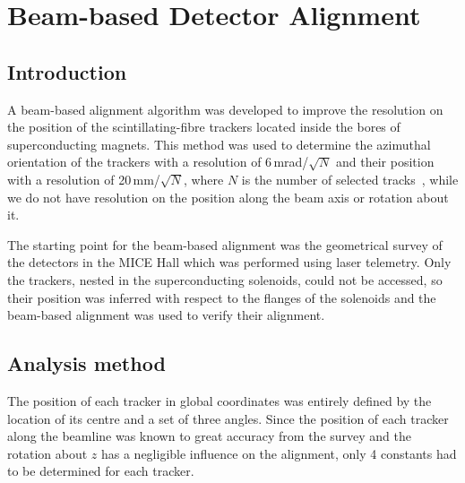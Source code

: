 \graphicspath{{09-Detector-alignment/Figures/}}

\section{Beam-based Detector Alignment}
\label{Sect:DA}

\subsection{Introduction}
\label{SubSect:DA_Intro}

A beam-based alignment algorithm was developed to improve the resolution on the position of the scintillating-fibre trackers located inside the bores of superconducting magnets. This method was used to determine the azimuthal orientation of the trackers with a resolution of 6\,mrad/$\sqrt{N}$ and their position with a resolution of 20\,mm/$\sqrt{N}$, where $N$ is the number of selected tracks~\cite{2018arXiv1805.06623T}, while we do not have resolution on the position along the beam axis or rotation about it.


The starting point for the beam-based alignment was the geometrical survey of the detectors in the MICE Hall which was performed using laser telemetry.
Only the trackers, nested in the superconducting solenoids, could not be accessed, so their position was inferred with respect to the flanges of the solenoids and the beam-based alignment was used to verify their alignment.

\subsection{Analysis method}
\label{SubSect:DA_Analysis}

The position of each tracker in global coordinates was entirely defined by the location of its centre and a set of three angles.
Since the position of each tracker along the beamline was known to great accuracy from the survey and the rotation about $z$ has a negligible influence on the alignment, only 4 constants had to be determined for each tracker.


